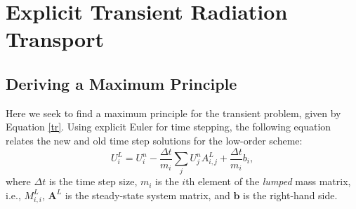 \section{Explicit Transient Radiation Transport}
\subsection{Deriving a Maximum Principle}
Here we seek to find a maximum principle for the transient problem, given by
Equation \ref{tr}.
Using explicit Euler for time stepping, the following equation relates the new and old
time step solutions for the low-order scheme:
\begin{equation}\label{newstep}
   U_i^L = U_i^n - \frac{\Delta t}{m_i}\sum\limits_j U_j^n A^L_{i,j}
      + \frac{\Delta t}{m_i}b_i,
\end{equation}
where $\Delta t$ is the time step size, $m_i$ is the $i$th element of the \emph{lumped} mass
matrix, i.e., $M^L_{i,i}$, $\mathbf{A}^L$ is the steady-state system matrix, and
$\mathbf{b}$ is the right-hand side.

